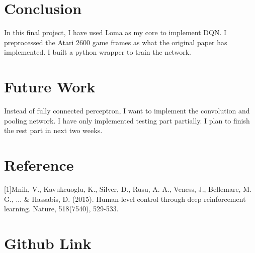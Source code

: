 \documentclass{article}
\begin{document}
\section{Conclusion}
In this final project, I have used Loma as my core to implement DQN. I preprocessed the Atari 2600 game frames as what the original paper
has implemented. I built a python wrapper to train the network.

\section{Future Work}
Instead of fully connected perceptron, I want to implement the convolution and pooling network. I have only implemented testing part partially.
I plan to finish the rest part in next two weeks.

\section{Reference}
[1]Mnih, V., Kavukcuoglu, K., Silver, D., Rusu, A. A., Veness, J., Bellemare, M. G., ... \& Hassabis, D. (2015). Human-level control through deep reinforcement learning. Nature, 518(7540), 529-533.
\section{Github Link}
\end{document}
